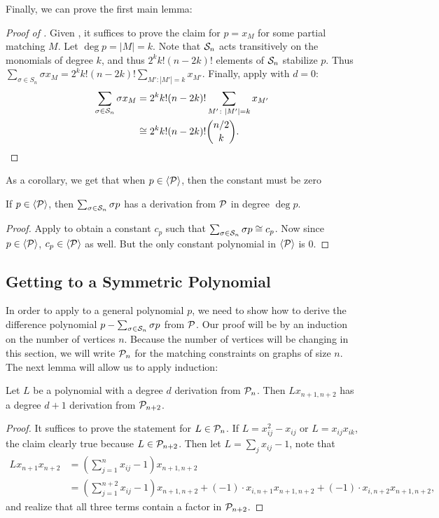 Finally, we can prove the first main lemma:
\begin{proof}[Proof of ]
Given ,
it suffices to prove the claim for
\(p = x_{M}\) for some partial matching \(M\).
Let $\deg p = |M| = k$.
Note that $\mathcal S_n$ acts transitively on the monomials of degree $k$, and thus $2^k k! (n-2k)!$ elements of $\mathcal S_n$ stabilize $p$.
Thus $\sum_{\sigma \in S_n} \sigma x_M = 2^k k! (n-2k)!\sum_{M': |M'| = k} x_{M'}$.
Finally, apply  with $d = 0$:
\begin{equation*}
  \begin{split}
  \sum_{\sigma \in \mathcal S_{n}} \sigma x_{M}
  &= 2^{k} k! (n-2k)! \sum_{M' \colon \left|M'\right| = k} x_{M'} \\
  &\cong
  2^{k} k! (n-2k)! \binom{n/2}{k}.
  \end{split}
\end{equation*}
\end{proof}
As a corollary, we get that when $p \in \langle \mathcal P \rangle$, then the constant must be zero 
\begin{corollary}\label{cor:constantiszero}
If $p \in \langle \mathcal P \rangle$, then $\sum_{\sigma \in \mathcal S_n} \sigma p$ has a derivation from $\mathcal P$ in degree $\deg p$.
\end{corollary}
\begin{proof}
Apply  to obtain a constant $c_p$ such that $\sum_{\sigma \in \mathcal S_n} \sigma p \cong c_p$. 
Now since $p \in \langle \mathcal P \rangle$, $c_p \in \langle \mathcal P \rangle$ as well. But the only constant polynomial in $\langle \mathcal P \rangle$ is $0$.
\end{proof}

\subsection{Getting to a Symmetric Polynomial}
In order to apply  to a general polynomial $p$, we need to show how to derive the difference polynomial $p - \sum_{\sigma \in \mathcal S_n} \sigma p$ from $\mathcal P$. Our proof will be by an induction on the number of vertices $n$. Because the number of vertices will be changing in this section, we will write $\mathcal P_n$ for the matching constraints on graphs of size $n$. 
The next lemma will allow us to apply induction:
\begin{lemma}
  \label{lem:degree-increase}
  Let \(L\) be a polynomial with a degree $d$ derivation from $\mathcal P_{n}$.
	Then $Lx_{n+1,n+2}$ has a degree $d+1$ derivation from $\mathcal P_{n+2}$.
\end{lemma}
\begin{proof}
It suffices to prove the statement for $L \in \mathcal P_n$. 
If $L = x_{ij}^2 - x_{ij}$ or $L = x_{ij}x_{ik}$, the claim clearly true because $L \in \mathcal P_{n+2}$.
Then let $L = \sum_j x_{ij} - 1$, note that 
\begin{align*}
Lx_{n+1}x_{n+2} &= (\sum_{j=1}^n x_{ij} - 1)x_{n+1,n+2} \\
&= (\sum_{j=1}^{n+2} x_{ij} - 1)x_{n+1,n+2} + (-1)\cdot x_{i,n+1}x_{n+1,n+2} + (-1)\cdot x_{i,n+2}x_{n+1,n+2},
\end{align*}
and realize that all three terms contain a factor in $\mathcal P_{n+2}$.
\end{proof}

